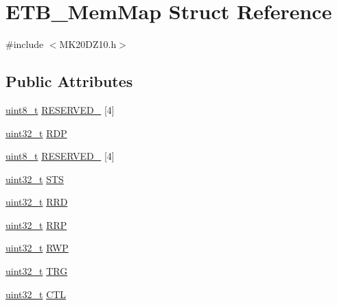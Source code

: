 \hypertarget{struct_e_t_b___mem_map}{}\section{E\+T\+B\+\_\+\+Mem\+Map Struct Reference}
\label{struct_e_t_b___mem_map}


{\ttfamily \#include $<$M\+K20\+D\+Z10.\+h$>$}

\subsection*{Public Attributes}
\begin{DoxyCompactItemize}
\item 
\hyperlink{_p_e___types_8h_aba7bc1797add20fe3efdf37ced1182c5}{uint8\+\_\+t} \hyperlink{struct_e_t_b___mem_map_af724f31f25bbd8ea68c27823c1dad054}{R\+E\+S\+E\+R\+V\+E\+D\+\_} \mbox{[}4\mbox{]}
\item 
\hyperlink{_p_e___types_8h_a33594304e786b158f3fb30289278f5af}{uint32\+\_\+t} \hyperlink{struct_e_t_b___mem_map_a1c10bbda4ba1bbe562b76e90bcb1bc61}{R\+DP}
\item 
\hyperlink{_p_e___types_8h_aba7bc1797add20fe3efdf37ced1182c5}{uint8\+\_\+t} \hyperlink{struct_e_t_b___mem_map_a46ec445024c6bff3ddf1a8c85eea7fdd}{R\+E\+S\+E\+R\+V\+E\+D\+\_} \mbox{[}4\mbox{]}
\item 
\hyperlink{_p_e___types_8h_a33594304e786b158f3fb30289278f5af}{uint32\+\_\+t} \hyperlink{struct_e_t_b___mem_map_a5a471e968aca953fb748c16b10d56939}{S\+TS}
\item 
\hyperlink{_p_e___types_8h_a33594304e786b158f3fb30289278f5af}{uint32\+\_\+t} \hyperlink{struct_e_t_b___mem_map_a270d960dd4107f020db1f9bf7ef845df}{R\+RD}
\item 
\hyperlink{_p_e___types_8h_a33594304e786b158f3fb30289278f5af}{uint32\+\_\+t} \hyperlink{struct_e_t_b___mem_map_a891b26a3c18779f393b9f699f42c9916}{R\+RP}
\item 
\hyperlink{_p_e___types_8h_a33594304e786b158f3fb30289278f5af}{uint32\+\_\+t} \hyperlink{struct_e_t_b___mem_map_a32780b4c79a1f22e2616d845f306f264}{R\+WP}
\item 
\hyperlink{_p_e___types_8h_a33594304e786b158f3fb30289278f5af}{uint32\+\_\+t} \hyperlink{struct_e_t_b___mem_map_a96dc184cb9f6ea6ba7b299b05c58d4ed}{T\+RG}
\item 
\hyperlink{_p_e___types_8h_a33594304e786b158f3fb30289278f5af}{uint32\+\_\+t} \hyperlink{struct_e_t_b___mem_map_a12988dd241cd1b4936f513afcd6fa803}{C\+TL}

\end{DoxyCompactItemize}
